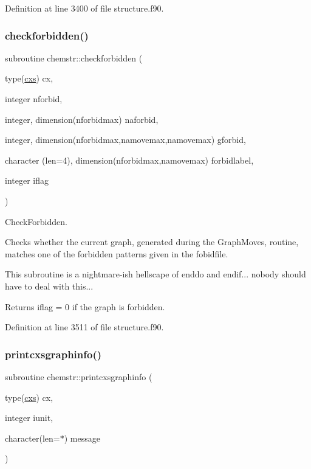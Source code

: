 Definition at line 3400 of file structure.\+f90.

\mbox{\label{namespacechemstr_abd5d6fd872f03496b78e8456a6788297}} 
\subsubsection{\texorpdfstring{checkforbidden()}{checkforbidden()}}
{\footnotesize\ttfamily subroutine chemstr\+::checkforbidden (\begin{DoxyParamCaption}\item[{type(\mbox{\hyperlink{structchemstr_1_1cxs}{cxs}})}]{cx,  }\item[{integer}]{nforbid,  }\item[{integer, dimension(nforbidmax)}]{naforbid,  }\item[{integer, dimension(nforbidmax,namovemax,namovemax)}]{gforbid,  }\item[{character (len=4), dimension(nforbidmax,namovemax)}]{forbidlabel,  }\item[{integer}]{iflag }\end{DoxyParamCaption})}



Check\+Forbidden. 

Checks whether the current graph, generated during the Graph\+Moves, routine, matches one of the forbidden patterns given in the fobidfile.

This subroutine is a nightmare-\/ish hellscape of enddo and endif... nobody should have to deal with this...

Returns iflag = 0 if the graph is forbidden. 

Definition at line 3511 of file structure.\+f90.

\mbox{\label{namespacechemstr_a04d94078390085dcf855f8df499ef7cc}} 
\subsubsection{\texorpdfstring{printcxsgraphinfo()}{printcxsgraphinfo()}}
{\footnotesize\ttfamily subroutine chemstr\+::printcxsgraphinfo (\begin{DoxyParamCaption}\item[{type(\mbox{\hyperlink{structchemstr_1_1cxs}{cxs}})}]{cx,  }\item[{integer}]{iunit,  }\item[{character(len=$\ast$)}]{message }\end{DoxyParamCaption})}



